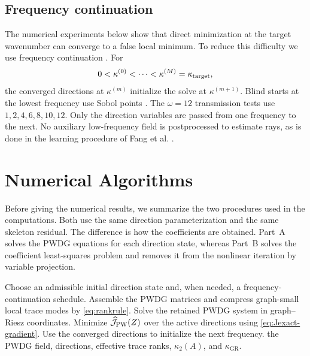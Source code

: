 \documentclass[pdflatex,sn-mathphys-num]{sn-jnl}
\theoremstyle{thmstyleone}
\theoremstyle{thmstyletwo}
\newcommand{\GR}{\mathrm{GR}}
\begin{document}
\subsection{Frequency continuation}\label{subsec:continuation}
The numerical experiments below show that direct minimization at the target wavenumber can converge to a false local minimum.  To reduce this difficulty we use frequency continuation \cite{Watson1989}.  For
\[
 0<\kappa^{(0)}<\cdots<\kappa^{(M)}=\kappa_{\rm target},
\]
the converged directions at $\kappa^{(m)}$ initialize the solve at $\kappa^{(m+1)}$.  Blind starts at the lowest frequency use Sobol points \cite{Sobol1967}.  The $\omega=12$ transmission tests use $1,2,4,6,8,10,12$.  Only the direction variables are passed from one frequency to the next.  No auxiliary low-frequency field is postprocessed to estimate rays, as is done in the learning procedure of Fang et al. \cite{FangQianZepedaZhao2017}.

\section{Numerical Algorithms}\label{sec:algorithm}
Before giving the numerical results, we summarize the two procedures used in the computations.  Both use the same direction parameterization and the same skeleton residual.  The difference is how the coefficients are obtained.  Part~A solves the PWDG equations for each direction state, whereas Part~B solves the coefficient least-squares problem and removes it from the nonlinear iteration by variable projection.

\begin{algorithm}[H]
\caption{Direction-optimized PWDG (Part A)}
\label{alg:automatic}
\begin{algorithmic}[1]
\State Choose an admissible initial direction state and, when needed, a frequency-continuation schedule.
  \State Assemble the PWDG matrices and compress graph-small local trace modes by \eqref{eq:rankrule}.
  \State Solve the retained PWDG system in graph--Riesz coordinates.
  \State Minimize $\widehat{\mathcal J}_{\rm PW}(Z)$ over the active directions using \eqref{eq:Jexact-gradient}.
  \State Use the converged directions to initialize the next frequency.
\EndFor
\State \Return the PWDG field, directions, effective trace ranks, $\kappa_2(A)$, and $\kappa_{\GR}$.
\end{algorithmic}
\end{algorithm}
\end{document}
